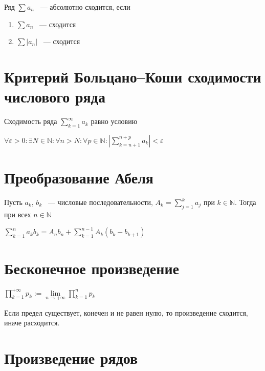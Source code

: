 \documentclass{article}
\begin{document}
        Ряд $\sum a_n$ ~--- абсолютно сходится, если
        
        \begin{enumerate}
        
            \item $\sum a_n$ ~--- сходится
            
            \item $\sum |a_n|$ ~--- сходится
            
        \end{enumerate}
        
    \newpage
    
    \section{Критерий Больцано--Коши сходимости числового ряда}
    
        Сходимость ряда $\sum\limits_{k = 1}^{\infty} a_k$ равно условию
        
        $\forall \varepsilon > 0 : \exists N \in \mathbb{N} : \forall n > N : \forall p \in \mathbb{N} : \left| \sum\limits_{k = n+1}^{n + p} a_k \right| < \varepsilon$
        
    \newpage
    
    \section{Преобразование Абеля}
    
        Пусть $a_k$, $b_k$ ~--- числовые последовательности, $A_k = \sum\limits_{j = 1}^k a_j$ при $k \in \mathbb{N}$. Тогда при всех $n \in \mathbb{N}$
        
        $\sum\limits_{k = 1}^n a_k b_k = A_n b_n+ \sum\limits^{n - 1}_{k = 1} A_k(b_k - b_{k + 1})$
        
    \newpage
    
    \section{Бесконечное произведение}
    
        $\prod\limits^{+\infty}_{k = 1} p_k := \lim\limits_{n \rightarrow +\infty} \prod\limits^n_{k = 1} p_k$
        
        Если предел существует, конечен и не равен нулю, то произведение сходится, иначе расходится.
    
    \newpage
    
    \section{Произведение рядов}
    
\end{document}
